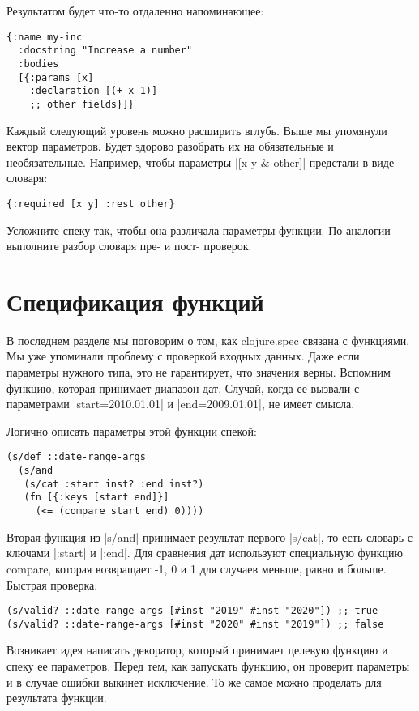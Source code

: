 Результатом будет что-то отдаленно напоминающее:

\begin{verbatim}
{:name my-inc
  :docstring "Increase a number"
  :bodies
  [{:params [x]
    :declaration [(+ x 1)]
    ;; other fields}]}
\end{verbatim}

Каждый следующий уровень можно расширить вглубь. Выше мы упомянули вектор
параметров. Будет здорово разобрать их на обязательные и
необязательные. Например, чтобы параметры \spverb|[x y & other]| предстали в виде
словаря:

\begin{verbatim}
{:required [x y] :rest other}
\end{verbatim}

Усложните спеку так, чтобы она различала параметры функции. По аналогии
выполните разбор словаря пре- и пост- проверок.

\section{Спецификация функций}

В последнем разделе мы поговорим о том, как clojure.spec связана с функциями. Мы
уже упоминали проблему с проверкой входных данных. Даже если параметры нужного
типа, это не гарантирует, что значения верны. Вспомним функцию, которая
принимает диапазон дат. Случай, когда ее вызвали с параметрами
\spverb|start=2010.01.01| и \spverb|end=2009.01.01|, не имеет смысла.

Логично описать параметры этой функции спекой:

\begin{verbatim}
(s/def ::date-range-args
  (s/and
   (s/cat :start inst? :end inst?)
   (fn [{:keys [start end]}]
     (<= (compare start end) 0))))
\end{verbatim}

Вторая функция из \spverb|s/and| принимает результат первого \spverb|s/cat|, то есть словарь с
ключами \spverb|:start| и \spverb|:end|. Для сравнения дат используют специальную функцию
compare, которая возвращает -1, 0 и 1 для случаев меньше, равно и
больше. Быстрая проверка:

\begin{verbatim}
(s/valid? ::date-range-args [#inst "2019" #inst "2020"]) ;; true
(s/valid? ::date-range-args [#inst "2020" #inst "2019"]) ;; false
\end{verbatim}

Возникает идея написать декоратор, который принимает целевую функцию и спеку ее
параметров. Перед тем, как запускать функцию, он проверит параметры и в случае
ошибки выкинет исключение. То же самое можно проделать для результата функции.

